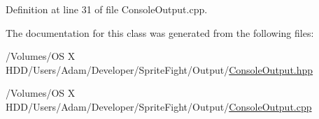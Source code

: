 Definition at line 31 of file Console\-Output.\-cpp.



The documentation for this class was generated from the following files\-:\begin{DoxyCompactItemize}
\item 
/\-Volumes/\-O\-S X H\-D\-D/\-Users/\-Adam/\-Developer/\-Sprite\-Fight/\-Output/\hyperlink{_console_output_8hpp}{Console\-Output.\-hpp}\item 
/\-Volumes/\-O\-S X H\-D\-D/\-Users/\-Adam/\-Developer/\-Sprite\-Fight/\-Output/\hyperlink{_console_output_8cpp}{Console\-Output.\-cpp}\end{DoxyCompactItemize}
